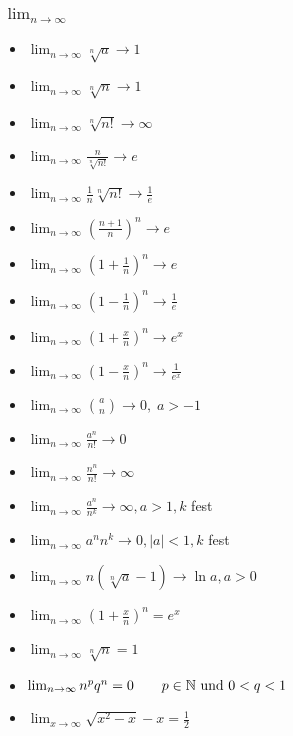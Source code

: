 \subsubsection{$\lim_{n \to \infty}$}
\begin{itemize}[leftmargin=*]
	\item $\lim_{n \to \infty} \sqrt[n]{a} \rightarrow 1$
	\item $\lim_{n \to \infty} \sqrt[n]{n} \rightarrow 1$
	\item $\lim_{n \to \infty} \sqrt[n]{n!} \rightarrow \infty$
	\item $\lim_{n \to \infty} \frac{n}{\sqrt[n]{n!}} \rightarrow e$
	\item $\lim_{n \to \infty} \frac{1}{n} \sqrt[n]{n!} \rightarrow \frac{1}{e}$
	\item $\lim_{n \to \infty} \left ( \frac{n+1}{n} \right )^n \rightarrow e$
	\item $\lim_{n \to \infty} \left ( 1 + \frac{1}{n} \right )^n \rightarrow e$
	\item $\lim_{n \to \infty} \left ( 1 - \frac{1}{n} \right )^n \rightarrow \frac{1}{e}$
	\item $\lim_{n \to \infty} \left ( 1 + \frac{x}{n} \right )^n \rightarrow e^x$
	\item $\lim_{n \to \infty} \left ( 1 - \frac{x}{n} \right )^n \rightarrow \frac{1}{e^x}$
	\item $\lim_{n \to \infty} {a \choose n} \rightarrow 0, \; a > -1$
	\item $\lim_{n \to \infty} \frac{a^n}{n!} \rightarrow 0$
	\item $\lim_{n \to \infty} \frac{n^n}{n!} \rightarrow \infty$
	\item $\lim_{n \to \infty} \frac{a^n}{n^k} \rightarrow \infty, a > 1, k$ fest
	\item $\lim_{n \to \infty} a^n n^k \rightarrow 0, |a| < 1, k$ fest
	\item $\lim_{n \to \infty} n(\sqrt[n]{a} - 1) \rightarrow \ln a, a > 0$
	\item $\lim_{n \to \infty} \left( 1+\frac{x}{n} \right)^n = e^x \quad$
	\item $\lim_{n \to \infty} \sqrt[n]{n} = 1$
	\item $\lim_{n \to \infty} n^p q^n = 0 \qquad p \in \mathbb{N} \text{ und } 0 < q < 1$
	\item $\lim_{x \to \infty} \sqrt{x^2-x}-x = \frac{1}{2}$ 
\end{itemize}
